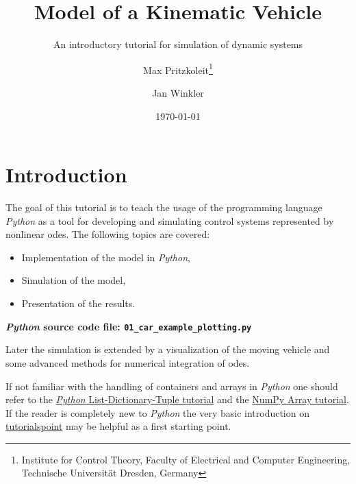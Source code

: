 \documentclass[a4paper,11pt,headinclude=true,headsepline,parskip=half,DIV=13]{scrartcl}
\title{Model of a Kinematic Vehicle}
\subtitle{An introductory tutorial for simulation of dynamic systems}
\author{Max Pritzkoleit\thanks{Institute for Control Theory, Faculty of Electrical and Computer Engineering, Technische Universität Dresden, Germany} \and Jan Winkler\footnotemark[1]}
\date{\today}
\newcommand{\py}{\emph{Python}\xspace}
\begin{document}
\maketitle




\tableofcontents

\newpage

\section{Introduction}
The goal of this tutorial is to teach the usage of the programming language \py as a tool for developing and simulating control systems  represented by nonlinear \glspl{ode}. The following topics are covered:
\begin{itemize}
\item Implementation of the model in \py,
\item Simulation of the model,
\item Presentation of the results.
\end{itemize}
\textbf{\py source code file: \texttt{01\_car\_example\_plotting.py}}

Later the simulation is extended by a visualization of the moving vehicle and some advanced methods for numerical integration of \glspl{ode}.

If not familiar with the handling of containers and arrays in \py one should refer to the \href{http://cs231n.github.io/python-numpy-tutorial/#python-containers}{\py List-Dictionary-Tuple tutorial} and the \href{http://cs231n.github.io/python-numpy-tutorial/#numpy}{NumPy Array tutorial}. If the reader is completely new to \py the very basic introduction on \href{https://www.tutorialspoint.com/python/index.htm}{tutorialspoint} may be helpful as a first starting point.
\end{document}
